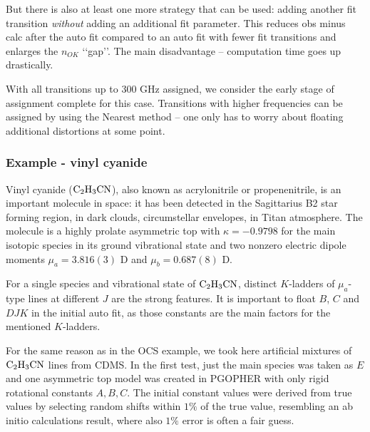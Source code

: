 \documentclass[11pt]{article}
\begin{document}
But there is also at least one more strategy that can be used: adding another fit transition \emph{without} adding an additional fit parameter. This reduces obs minus calc after the auto fit compared to an auto fit with fewer fit transitions and enlarges the $n_{OK}$ \lq\lq{}gap\rq\rq{}. The main disadvantage -- computation time goes up drastically. %

With all transitions up to 300 GHz assigned, we consider the early stage of assignment complete for this case. Transitions with higher frequencies can be assigned by using the Nearest method -- one only has to worry about floating additional distortions at some point. 

\subsubsection{Example - vinyl cyanide}

Vinyl cyanide ($\rm C_2H_3CN$), also known as acrylonitrile or propenenitrile, is an important molecule in space: it has been detected in the Sagittarius B2 star forming region, in dark clouds, circumstellar envelopes, in Titan atmosphere. The molecule is a highly prolate asymmetric top with $\kappa = -0.9798$ for the main isotopic species in its ground vibrational state and two nonzero electric dipole moments $\mu_a = 3.816(3)$ D and $\mu_b = 0.687(8)$ D.  

For a single species and vibrational state of $\rm C_2H_3CN$, 
distinct $K$-ladders of $\mu_a$-type lines at different $J$ are the strong features. %
It is important to float $B$, $C$ and $DJK$ in the initial auto fit, as those constants are the main factors for the mentioned $K$-ladders. 


For the same reason as in the OCS example, we took here artificial mixtures of $\rm C_2H_3CN$ lines from CDMS. In the first test, just the main species was taken as $E$ and one asymmetric top model was created in PGOPHER with only rigid rotational constants $A, B, C$. The initial constant values were derived from true values by selecting random shifts within $1\%$ of the true value, resembling an ab initio calculations result, where also $1\%$ error is often a fair guess. 
\end{document}
